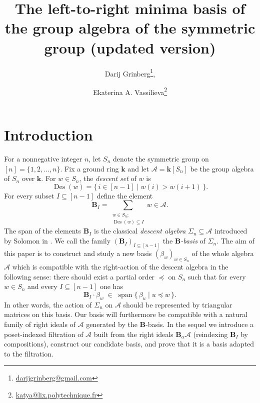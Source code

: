 \documentclass[submission]{FPSAC2026}
\title[The left-to-right minima basis]{The left-to-right minima basis of the group algebra of the symmetric group (updated version)}
\author[D. Grinberg \and E.A. Vassilieva]{Darij Grinberg\thanks{\href{mailto:darijgrinberg@gmail.com}{darijgrinberg@gmail.com}}\addressmark{1}, \and Ekaterina A. Vassilieva\thanks{\href{mailto:katya@lix.polytechnique.fr}{katya@lix.polytechnique.fr}}\addressmark{2}}
\newcommand{\kk}{\mathbf{k}} %
\newcommand{\Des}{\operatorname{Des}}
\newcommand{\ive}[1]{\left[ #1 \right]}
\begin{document}
\maketitle

\section{Introduction}

For a nonnegative integer \(n\), let \(S_n\) denote the symmetric group on
\([n]=\{1,2,\dots,n\}\).  Fix a ground ring \(\kk\) and let
\(\mathcal{A} = \kk[S_n]\) be the group algebra of \(S_n\) over
\(\kk\). For \(w\in S_n\), the \emph{descent set} of \(w\) is
\[
\Des (w) =\{\, i \in \ive{n-1} \mid w(i)>w(i+1)\,\}.
\]
For every subset \(I\subseteq[n-1]\) define the element
\[
\mathbf{B}_I=\sum_{\substack{w\in S_n;\\ \Des (w) \subseteq I}} w
\in\mathcal{A}.
\]
The span of the elements \(\mathbf{B}_I\) is the classical \emph{descent
algebra} \(\Sigma_n\subseteq\mathcal{A}\) introduced by Solomon in \cite{Sol76}. We call the family
\((\mathbf{B}_I)_{I\subseteq[n-1]}\) the
\emph{\(\mathbf{B}\)-basis} of \(\Sigma_n\).
The aim of this paper is to construct and study a new basis
\((\beta_w)_{w\in S_n}\) of the whole algebra \(\mathcal{A}\) which is
compatible with the right-action of the descent algebra in the following
sense: there should exist a partial order \(\preceq\) on \(S_n\) such that
for every \(w\in S_n\) and every \(I\subseteq[n-1]\) one has
\[
\mathbf{B}_I\cdot \beta_w\;\in\;
\operatorname{span}\{\,\beta_u\mid u\preceq w\,\}.
\]
In other words, the action of \(\Sigma_n\) on \(\mathcal A\) should
be represented by triangular matrices on this basis.
Our basis will furthermore be compatible with a
natural family of right ideals of \(\mathcal A\) generated by the
\(\mathbf{B}\)-basis.  In the sequel we introduce a
poset-indexed filtration of \(\mathcal A\) built from the right ideals
\(\mathbf{B}_\alpha\mathcal A\) (reindexing \(\mathbf{B}_I\) by
compositions), construct our candidate basis, and prove that it is a
basis adapted to the filtration.
\end{document}
